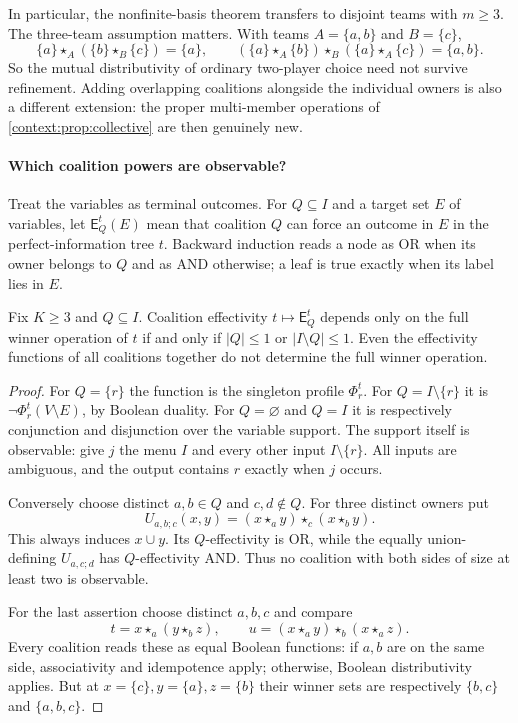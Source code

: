 In particular, the nonfinite-basis theorem transfers to disjoint teams
with $m\geq3$. The three-team assumption matters. With teams
$A=\{a,b\}$ and $B=\{c\}$,
\[
 \{a\}\star_A(\{b\}\star_B\{c\})=\{a\},\qquad
 (\{a\}\star_A\{b\})\star_B(\{a\}\star_A\{c\})=\{a,b\}.
\]
So the mutual distributivity of ordinary two-player choice need not
survive refinement. Adding overlapping coalitions alongside the
individual owners is also a different extension: the proper
multi-member operations of \cref{context:prop:collective} are then
genuinely new.

\paragraph{Which coalition powers are observable?}
Treat the variables as terminal outcomes. For $Q\subseteq I$ and a
target set $E$ of variables, let $\mathsf E_Q^t(E)$ mean that coalition
$Q$ can force an outcome in $E$ in the perfect-information tree $t$.
Backward induction reads a node as OR when its owner belongs to $Q$
and as AND otherwise; a leaf is true exactly when its label lies in $E$.

\begin{proposition}
\label{context:prop:observable-coalitions}
Fix $K\geq3$ and $Q\subseteq I$. Coalition effectivity
$t\mapsto\mathsf E_Q^t$ depends only on the full winner operation of
$t$ if and only if $|Q|\leq1$ or $|I\setminus Q|\leq1$.
Even the effectivity functions of all coalitions together do not
determine the full winner operation.
\end{proposition}
\begin{proof}
For $Q=\{r\}$ the function is the singleton profile $\Phi_r^t$.
For $Q=I\setminus\{r\}$ it is
$\neg\Phi_r^t(V\setminus E)$, by Boolean duality. For $Q=\varnothing$
and $Q=I$ it is respectively conjunction and disjunction over the
variable support. The support itself is observable: give $j$ the menu
$I$ and every other input $I\setminus\{r\}$. All inputs are ambiguous,
and the output contains $r$ exactly when $j$ occurs.

Conversely choose distinct $a,b\in Q$ and $c,d\notin Q$. For three
distinct owners put
\[
 U_{a,b;c}(x,y)=(x\star_a y)\star_c(x\star_b y).
\]
This always induces $x\cup y$. Its $Q$-effectivity is OR, while the
equally union-defining $U_{a,c;d}$ has $Q$-effectivity AND.
Thus no coalition with both sides of size at least two is observable.

For the last assertion choose distinct $a,b,c$ and compare
\[
 t=x\star_a(y\star_bz),\qquad
 u=(x\star_a y)\star_b(x\star_a z).
\]
Every coalition reads these as equal Boolean functions: if $a,b$ are
on the same side, associativity and idempotence apply; otherwise,
Boolean distributivity applies. But at
$x=\{c\},y=\{a\},z=\{b\}$ their winner sets are respectively
$\{b,c\}$ and $\{a,b,c\}$.
\end{proof}


